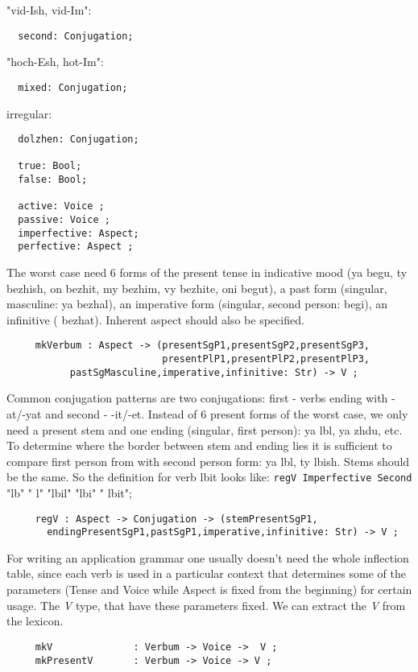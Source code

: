\noindent "{\cyr vid-Ish\cyrsftsn{}, vid-Im}":
\begin{verbatim}
  second: Conjugation;
\end{verbatim}
"{\cyr hoch-Esh\cyrsftsn{}, hot-Im}":
\begin{verbatim}
  mixed: Conjugation;
\end{verbatim}
irregular:
\begin{verbatim}
  dolzhen: Conjugation;

  true: Bool;
  false: Bool;

  active: Voice ;
  passive: Voice ;
  imperfective: Aspect;
  perfective: Aspect ;
\end{verbatim}

The worst case need 6 forms of the present tense in indicative
mood ({\cyr ya begu}, {\cyr ty bezhish\cyrsftsn{}}, {\cyr on
bezhit}, {\cyr my bezhim}, {\cyr vy bezhite}, {\cyr oni begut}), a
past form (singular, masculine: {\cyr ya bezhal}), an imperative
form (singular, second person: {\cyr begi}), an infinitive ({\cyr
bezhat\cyrsftsn{}}). Inherent aspect should also be specified.
\begin{verbatim}
     mkVerbum : Aspect -> (presentSgP1,presentSgP2,presentSgP3,
                           presentPlP1,presentPlP2,presentPlP3,
           pastSgMasculine,imperative,infinitive: Str) -> V ;
\end{verbatim}

Common conjugation patterns are two conjugations: first - verbs
ending with {\cyr -at\cyrsftsn{}/-yat\cyrsftsn{}} and second -
{\cyr -it\cyrsftsn{}/-et\cyrsftsn{}}. Instead of 6 present forms
of the worst case, we only need a present stem and one ending
(singular, first person): {\cyr ya l\cyryu{}bl\cyryu{}}, {\cyr ya
zhdu}, etc. To determine where the border between stem and ending
lies it is sufficient to compare first person from with second
person form: {\cyr ya l\cyryu{}bl\cyryu{}}, {\cyr ty
l\cyryu{}bish\cyrsftsn{}}. Stems should be the same. So the
definition for verb {\cyr l\cyryu{}bit\cyrsftsn{}} looks like:
\texttt{regV Imperfective Second }"{\cyr l\cyryu{}b}" "{\cyr
l\cyryu{}}" "{\cyr l\cyryu{}bil}" "{\cyr l\cyryu{}bi}" "{\cyr
l\cyryu{}bit\cyrsftsn{}}";
\begin{verbatim}
     regV : Aspect -> Conjugation -> (stemPresentSgP1,
       endingPresentSgP1,pastSgP1,imperative,infinitive: Str) -> V ;
\end{verbatim}

For writing an application grammar one usually doesn't need the
whole inflection table, since each verb is used in a particular
context that determines some of the parameters (Tense and Voice
while Aspect is fixed from the beginning) for certain usage. The
{\it V} type, that have these parameters fixed. We can extract the
{\it V} from the lexicon.
\begin{verbatim}
     mkV              : Verbum -> Voice ->  V ;
     mkPresentV       : Verbum -> Voice -> V ;
\end{verbatim}

